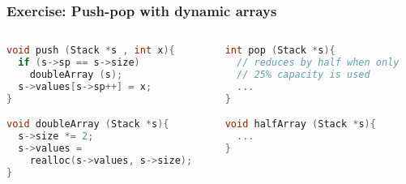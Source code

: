 \documentclass[aspectratio=169]{beamer}
\begin{document}
\begin{frame}[fragile]\frametitle{Exercise: Push-pop with dynamic arrays}
    

\begin{columns}
\begin{column}{.48\textwidth}
\begin{lstlisting}[language=C++, emph={push,pop,doubleArray,realloc}]
void push (Stack *s , int x){
  if (s->sp == s->size)
    doubleArray (s);
  s->values[s->sp++] = x;
}

void doubleArray (Stack *s){
  s->size *= 2;
  s->values =
    realloc(s->values, s->size);
}
\end{lstlisting}
%
\end{column}
\begin{column}{.50\textwidth}
%
\begin{lstlisting}[language=C++, emph={push,pop,doubleArray,realloc}]
int pop (Stack *s){
  // reduces by half when only
  // 25% capacity is used
  ...
}

void halfArray (Stack *s){
  ...
}
\end{lstlisting}
%
\end{column}
\end{columns}


\end{frame}
\end{document}
